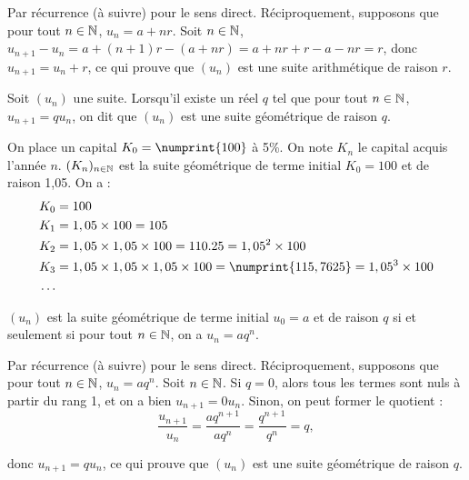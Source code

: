 \documentclass[a4paper,10pt,DIV18,BCOR0mm]{scrartcl}
\begin{document}
\begin{demonstration}
 Par récurrence (à suivre) pour le sens direct. Réciproquement, supposons que pour tout $n\in\mathbb{N}$, $u_n=a+nr$.
Soit $n\in\mathbb{N}$, $u_{n+1}-u_n=a+(n+1)r-(a+nr)=a+nr+r-a-nr=r$, donc $u_{n+1}=u_n+r$, ce qui prouve que $(u_n)$ est 
une suite arithmétique de raison $r$.
\end{demonstration}


\begin{definition}
 Soit $(u_n)$ une suite. Lorsqu'il existe un réel $q$ tel que pour tout 
$n\in\mathbb{N}$, $u_{n+1}=qu_n$, on dit que $(u_n)$ est une suite géométrique de raison $q$.
\end{definition}
\begin{exemple}
 On place un capital $K_0=\numprint{100}$ à 5\%. On note $K_n$ le capital acquis
l'année $n$. $(K_n)_{n\in\mathbb{N}}$ est la suite géométrique de terme initial $K_0=100$
et de raison 1,05. On a :
\begin{align*}
 K_0&=100\\
 K_1&=1,05\times100=105\\
 K_2&=1,05\times1,05\times100=110.25=1,05^2\times100\\
 K_3&=1,05\times1,05\times1,05\times100=\numprint{115,7625}=1,05^3\times100\\
\dots
\end{align*}
\end{exemple}

\begin{theoreme}
 $(u_n)$ est la suite géométrique de terme initial $u_0=a$ et de raison $q$ si et seulement si pour tout $n\in\mathbb{N}$, on a $u_n=aq^n$.
\end{theoreme}
\begin{demonstration}
Par récurrence (à suivre) pour le sens direct. Réciproquement, supposons que pour tout $n\in\mathbb{N}$, $u_n=aq^n$.
Soit $n\in\mathbb{N}$. Si $q=0$, alors tous les termes sont nuls à partir du rang 1, et on a bien $u_{n+1}=0u_n$.
Sinon, on peut former le quotient :
\[
 \frac{u_{n+1}}{u_n}=\frac{aq^{n+1}}{aq^n}=\frac{q^{n+1}}{q^n}=q,
\]

donc $u_{n+1}=qu_n$, ce qui prouve que $(u_n)$ est une suite géométrique de raison $q$.
\end{demonstration}
\end{document}
